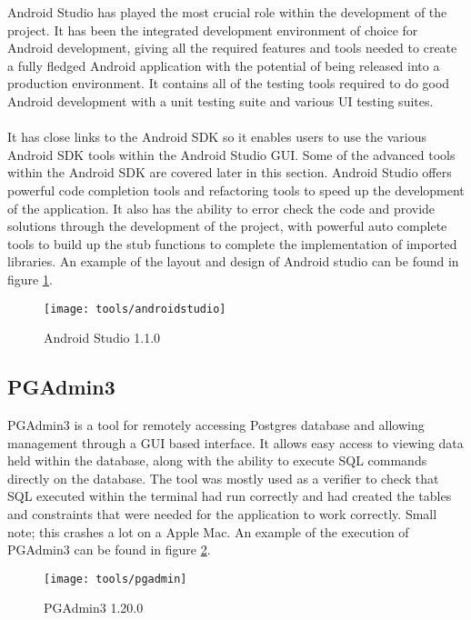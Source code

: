 Android Studio has played the most crucial role within the development of the project. It has been the integrated development environment of choice for Android development, giving all the required features and tools needed to create a fully fledged Android application with the potential of being released into a production environment. It contains all of the testing tools required to do good Android development with a unit testing suite and various UI testing suites.\\
\\
It has close links to the Android SDK so it enables users to use the various Android SDK tools within the Android Studio GUI. Some of the advanced tools within the Android SDK are covered later in this section. Android Studio offers powerful code completion tools and refactoring tools to speed up the development of the application. It also has the ability to error check the code and provide solutions through the development of the project, with powerful auto complete tools to build up the stub functions to complete the implementation of imported libraries. An example of the layout and design of Android studio can be found in figure \ref{fig:android_studio_image}.

\begin{figure}[H]
    \centering
    \texttt{[image: tools/androidstudio]}
    \caption{Android Studio 1.1.0}
    \label{fig:android_studio_image}
\end{figure} 

\subsection*{PGAdmin3}

PGAdmin3 is a tool for remotely accessing Postgres database and allowing management through a GUI based interface. It allows easy access to viewing data held within the database, along with the ability to execute SQL commands directly on the database. The tool was mostly used as a verifier to check that SQL executed within the terminal had run correctly and had created the tables and constraints that were needed for the application to work correctly. Small note; this crashes a lot on a Apple Mac. An example of the execution of PGAdmin3 can be found in figure \ref{fig:pg_admin_image}.

\begin{figure}[H]
    \centering
    \texttt{[image: tools/pgadmin]}
    \caption{PGAdmin3 1.20.0}
    \label{fig:pg_admin_image}
\end{figure} 

